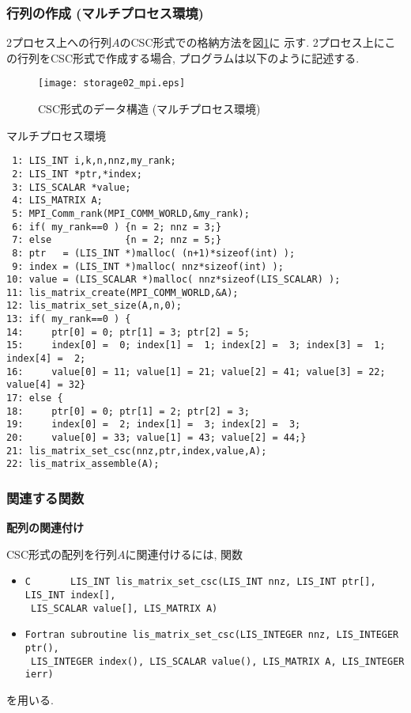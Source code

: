 \documentclass[a4paper]{jarticle}
\begin{document}
{{\subsubsection{行列の作成 (マルチプロセス環境)}
2プロセス上への行列$A$のCSC形式での格納方法を図\ref{fig:storage02_mpi}に
示す. 
2プロセス上にこの行列をCSC形式で作成する場合, プログラムは以下のように記述する. 
\begin{figure}[h]
{\centering 
\texttt{[image: storage02\_mpi.eps]} 
\caption{CSC形式のデータ構造 (マルチプロセス環境)}\label{fig:storage02_mpi}}
\end{figure}
\begin{itembox}[l]{マルチプロセス環境}
\small
\begin{verbatim}
 1: LIS_INT i,k,n,nnz,my_rank;
 2: LIS_INT *ptr,*index;
 3: LIS_SCALAR *value;
 4: LIS_MATRIX A;
 5: MPI_Comm_rank(MPI_COMM_WORLD,&my_rank);
 6: if( my_rank==0 ) {n = 2; nnz = 3;}
 7: else             {n = 2; nnz = 5;}
 8: ptr   = (LIS_INT *)malloc( (n+1)*sizeof(int) );
 9: index = (LIS_INT *)malloc( nnz*sizeof(int) );
10: value = (LIS_SCALAR *)malloc( nnz*sizeof(LIS_SCALAR) );
11: lis_matrix_create(MPI_COMM_WORLD,&A);
12: lis_matrix_set_size(A,n,0);
13: if( my_rank==0 ) {
14:     ptr[0] = 0; ptr[1] = 3; ptr[2] = 5;
15:     index[0] =  0; index[1] =  1; index[2] =  3; index[3] =  1; index[4] =  2;
16:     value[0] = 11; value[1] = 21; value[2] = 41; value[3] = 22; value[4] = 32}
17: else {
18:     ptr[0] = 0; ptr[1] = 2; ptr[2] = 3;
19:     index[0] =  2; index[1] =  3; index[2] =  3;
20:     value[0] = 33; value[1] = 43; value[2] = 44;}
21: lis_matrix_set_csc(nnz,ptr,index,value,A);
22: lis_matrix_assemble(A);
\end{verbatim}
\end{itembox}

\subsubsection{関連する関数}
\noindent
{\bf 配列の関連付け}

CSC形式の配列を行列$A$に関連付けるには, 関数
\begin{itemize}
\item \verb|C       LIS_INT lis_matrix_set_csc(LIS_INT nnz, LIS_INT ptr[], LIS_INT index[],|\\
      \verb| LIS_SCALAR value[], LIS_MATRIX A)|
\item \verb|Fortran subroutine lis_matrix_set_csc(LIS_INTEGER nnz, LIS_INTEGER ptr(),|\\
      \verb| LIS_INTEGER index(), LIS_SCALAR value(), LIS_MATRIX A, LIS_INTEGER ierr)|
\end{itemize}
を用いる. 

}}
\end{document}
